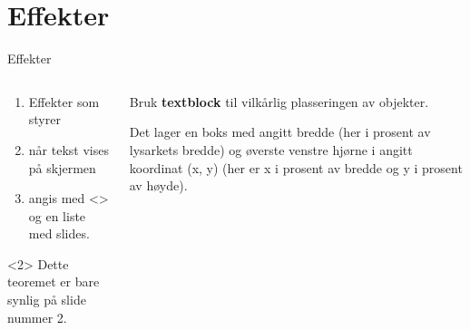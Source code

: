 \documentclass[norsk]{beamer}
\begin{document}
\section{Effekter}


\begin{frame}{Effekter}
    \begin{columns}[onlytextwidth]
        \begin{column}{0.49\textwidth}
            \begin{enumerate}[<+-|alert@+>]
                \item
                Effekter som styrer

                \item
                når tekst vises på skjermen

                \item
                angis med <> og en liste med slides.
            \end{enumerate}

            \begin{theorem}<2>
                Dette teoremet er bare synlig på slide nummer 2.
            \end{theorem}
        \end{column}
        \begin{column}{0.49\textwidth}
            Bruk \textbf<2->{textblock} til vilkårlig plasseringen av objekter.

            \pause
            \medskip

            Det lager en boks
            med angitt bredde (her i prosent av lysarkets bredde)
            og øverste venstre hjørne i angitt koordinat (x, y) (her er x i prosent av bredde og y i prosent av høyde).
        \end{column}
    \end{columns}
    

\end{frame}
\end{document}
